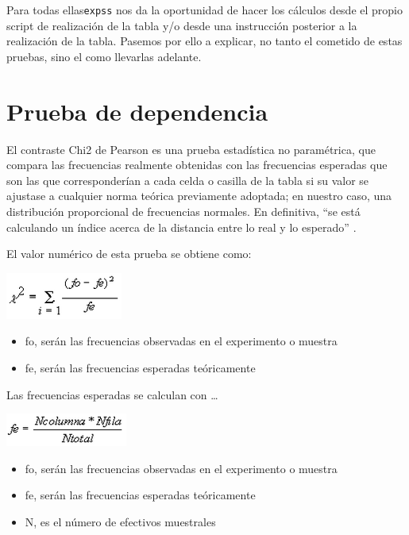\documentclass[
]{book}
\providecommand{\tightlist}{%
  \setlength{\itemsep}{0pt}\setlength{\parskip}{0pt}}
\begin{document}
Para todas ellas\texttt{expss} nos da la oportunidad de hacer los cálculos desde el propio script de realización de la tabla y/o desde una instrucción posterior a la realización de la tabla. Pasemos por ello a explicar, no tanto el cometido de estas pruebas, sino el como llevarlas adelante.

\hypertarget{prueba-de-dependencia}{%
\section{Prueba de dependencia}\label{prueba-de-dependencia}}

El contraste Chi2 de Pearson es una prueba estadística no paramétrica, que compara las frecuencias realmente obtenidas con las frecuencias esperadas que son las que corresponderían a cada celda o casilla de la tabla si su valor se ajustase a cualquier norma teórica previamente adoptada; en nuestro caso, una distribución proporcional de frecuencias normales. En definitiva, ``se está calculando un índice acerca de la distancia entre lo real y lo esperado'' \citet{manzano1995}.

El valor numérico de esta prueba se obtiene como:

\includegraphics{data/embim12.png}

\begin{itemize}
\tightlist
\item
  fo, serán las frecuencias observadas en el experimento o muestra
\item
  fe, serán las frecuencias esperadas teóricamente
\end{itemize}

Las frecuencias esperadas se calculan con \ldots{}

\includegraphics{data/embim13.png}

\begin{itemize}
\tightlist
\item
  fo, serán las frecuencias observadas en el experimento o muestra
\item
  fe, serán las frecuencias esperadas teóricamente
\item
  N, es el número de efectivos muestrales
\end{itemize}
\end{document}
